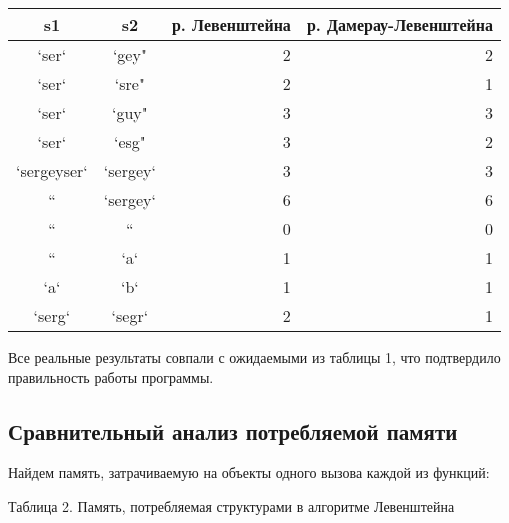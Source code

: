 \documentclass[a4paper, 14pt]{article}
\begin{document}
\begin{center}
\begin{flushleft}
\begin{flushleft}
        \begin{tabular}{ | c | c | r | r | }
        \hline
s1 & s2 & р. Левенштейна & р. Дамерау-Левенштейна \\ \hline
`ser` & `gey" & 2 & 2\\
`ser` & `sre" & 2 & 1\\
`ser` & `guy" & 3 & 3\\
`ser` & `esg" & 3 & 2\\
`sergeyser` & `sergey` & 3 & 3\\
`` & `sergey` & 6 & 6\\
`` & `` & 0 & 0\\
`` & `a` & 1 & 1\\
`a` & `b` & 1 & 1\\
`serg` & `segr` & 2 & 1\\
\hline
        \end{tabular}
	
        Все реальные результаты совпали с ожидаемыми из таблицы 1, что подтвердило правильность работы программы.
                
        \end{flushleft}

	\subsection{Сравнительный анализ потребляемой памяти}
	Найдем память, затрачиваемую на объекты одного вызова каждой из функций:\\
	\begin{center}
  	Таблица 2. Память, потребляемая структурами в алгоритме Левенштейна\\
	\end{center}
	

\end{flushleft}
\end{center}
\end{document}
